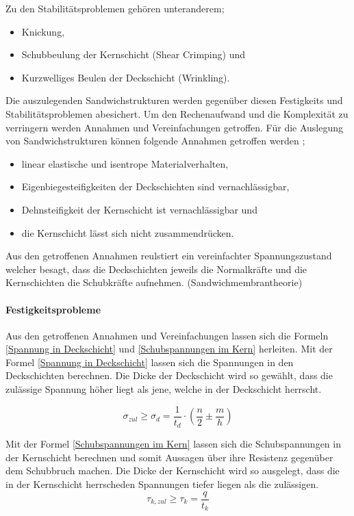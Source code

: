   Zu den Stabilitätsproblemen gehören unteranderem;
  \begin{itemize}
    \item Knickung,
    \item Schubbeulung der Kernschicht (Shear Crimping) und
    \item Kurzwelliges Beulen der Deckschicht (Wrinkling).
  \end{itemize}

  Die auszulegenden Sandwichstrukturen werden gegenüber diesen Festigkeits und Stabilitätsproblemen abesichert. Um den Rechenaufwand und die Komplexität zu verringern werden Annahmen und Vereinfachungen getroffen. Für die Auslegung von Sandwichstrukturen können folgende Annahmen getroffen werden \cite{ETH}\cite{klein};
  \begin{itemize}
    \item linear elastische und isentrope Materialverhalten,
    \item Eigenbiegesteifigkeiten der Deckschichten sind vernachlässigbar,
    \item Dehnsteifigkeit der Kernschicht ist vernachlässigbar und
    \item die Kernschicht lässt sich nicht zusammendrücken.
  \end{itemize}
  Aus den getroffenen Annahmen reulstiert ein vereinfachter Spannungszustand welcher besagt, dass die Deckschichten jeweils die Normalkräfte und die Kernschichten die Schubkräfte aufnehmen. (Sandwichmembrantheorie)

    \paragraph{Festigkeitsprobleme}
    Aus den getroffenen Annahmen und Vereinfachungen lassen sich die Formeln \ref{Spannung in Deckschicht} und \ref{Schubspannungen im Kern} herleiten. Mit der Formel \ref{Spannung in Deckschicht} lassen sich die Spannungen in den Deckschichten berechnen. Die Dicke der Deckschicht wird so gewählt, dass die zulässige Spannung höher liegt als jene, welche in der Deckschicht herrscht.

    \begin{equation}
      \label{Spannung in Deckschicht}
      \sigma_{zul} \geq \sigma_d = \frac{1}{t_d}\cdot \left ( \frac{n}{2} \pm \frac{m}{h}\right )
    \end{equation}

    Mit der Formel \ref{Schubspannungen im Kern} lassen sich die Schubspannungen in der Kernschicht berechnen und somit Aussagen über ihre Resistenz gegenüber dem Schubbruch machen. Die Dicke der Kernschicht wird so ausgelegt, dass die in der Kernschicht herrscheden Spannungen tiefer liegen als die zulässigen.
    \begin{equation}
      \label{Schubspannungen im Kern}
      \tau_{k,zul} \geq \tau_k = \frac{q}{t_k}
    \end{equation}

